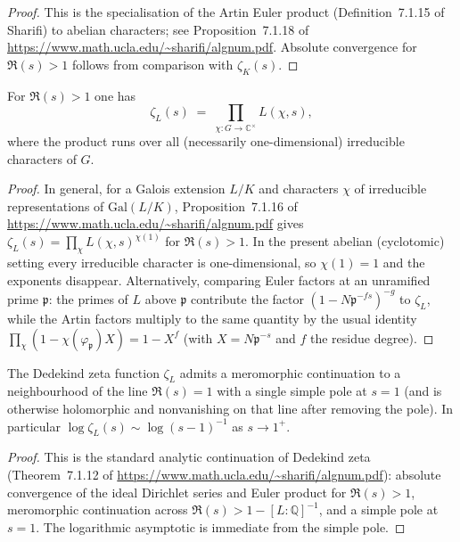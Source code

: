 {\begin{proof}
This is the specialisation of the Artin Euler product (Definition~7.1.15 of Sharifi) to
abelian characters; see Proposition~7.1.18 of
\url{https://www.math.ucla.edu/~sharifi/algnum.pdf}.  Absolute convergence for $\Re(s)>1$
follows from comparison with $\zeta_K(s)$.
\end{proof}

\begin{lemma}\label{Dedekind-factor}
For $\Re(s) > 1$ one has
\[
\zeta_L(s) \;=\; \prod_{\chi : G \to \mathbb{C}^\times} L(\chi,s),
\]
where the product runs over all (necessarily one-dimensional) irreducible characters of $G$.
\end{lemma}

\begin{proof}
In general, for a Galois extension $L/K$ and characters $\chi$ of irreducible representations of
$\mathrm{Gal}(L/K)$, Proposition~7.1.16 of
\url{https://www.math.ucla.edu/~sharifi/algnum.pdf} gives
$\zeta_L(s) = \prod_\chi L(\chi,s)^{\chi(1)}$ for $\Re(s)>1$.  In the present abelian
(cyclotomic) setting every irreducible character is one-dimensional, so $\chi(1)=1$ and the
exponents disappear.  Alternatively, comparing Euler factors at an unramified prime
$\mathfrak{p}$: the primes of $L$ above $\mathfrak{p}$ contribute the factor
$(1 - N\mathfrak{p}^{-fs})^{-g}$ to $\zeta_L$, while the Artin factors multiply to the same
quantity by the usual identity $\prod_\chi (1 - \chi(\varphi_{\mathfrak{p}}) X) = 1 - X^f$
(with $X = N\mathfrak{p}^{-s}$ and $f$ the residue degree).
\end{proof}

\begin{lemma}\label{Dedekind-pole}
The Dedekind zeta function $\zeta_L$ admits a meromorphic continuation to a neighbourhood of
the line $\Re(s)=1$ with a single simple pole at $s=1$ (and is otherwise holomorphic and
nonvanishing on that line after removing the pole).  In particular
$\log \zeta_L(s) \sim \log(s-1)^{-1}$ as $s \to 1^+$.
\end{lemma}

\begin{proof}
This is the standard analytic continuation of Dedekind zeta (Theorem~7.1.12 of
\url{https://www.math.ucla.edu/~sharifi/algnum.pdf}): absolute convergence of the ideal
Dirichlet series and Euler product for $\Re(s)>1$, meromorphic continuation across
$\Re(s)>1-[L:\mathbb{Q}]^{-1}$, and a simple pole at $s=1$.  The logarithmic asymptotic is
immediate from the simple pole.
\end{proof}

}
